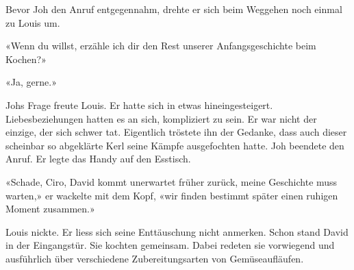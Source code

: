 Bevor Joh den Anruf entgegennahm, drehte er sich beim Weggehen noch einmal zu Louis
um.

«Wenn du willst, erzähle ich dir den Rest unserer Anfangsgeschichte beim
Kochen?»

«Ja, gerne.»

Johs Frage freute Louis. 
Er hatte sich in etwas hineingesteigert. Liebesbeziehungen hatten es an
sich, kompliziert zu sein. Er war nicht der einzige, der sich schwer
tat. Eigentlich tröstete ihn der Gedanke, dass auch dieser scheinbar so abgeklärte Kerl seine Kämpfe
ausgefochten hatte. 
Joh beendete den Anruf. Er legte das Handy auf den Esstisch.

«Schade, Ciro, David kommt unerwartet früher zurück, meine Geschichte
muss warten,» er wackelte mit dem Kopf, «wir finden bestimmt später
einen ruhigen Moment zusammen.»

Louis nickte. Er liess sich seine Enttäuschung nicht anmerken.
Schon stand David in der Eingangstür. Sie kochten gemeinsam. Dabei
redeten sie vorwiegend und ausführlich über verschiedene
Zubereitungsarten von Gemüseaufläufen.
